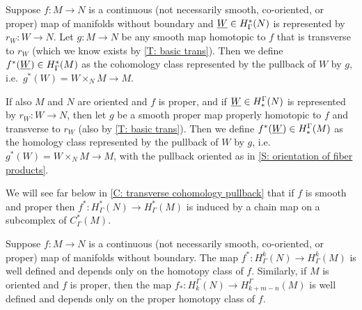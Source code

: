 \begin{definition}\label{D: cohomology pullback and homology transfer}
	Suppose $f \colon M \to N$ is a continuous (not necessarily smooth, co-oriented, or proper) map of manifolds without boundary and $\underline{W} \in H^*_\Gamma(N)$ is represented by $r_W \colon W \to N$.
	Let $g \colon M \to N$ be any smooth map homotopic to $f$ that is transverse to $r_W$ (which we know exists by \cref{T: basic trans}).
	Then we define $f^*(\underline{W}) \in H^*_\Gamma(M)$ as the cohomology class represented by the pullback of $W$ by $g$, i.e.\ $g^*(W) = W \times_N M \to M$.

	If also $M$ and $N$ are oriented and $f$ is proper, and if $\underline{W} \in H_*^\Gamma(N)$ is represented by $r_W \colon W \to N$, then let $g$ be a smooth proper map properly homotopic to $f$ and transverse to $r_W$ (also by \cref{T: basic trans}).
	Then we define $f^*(\underline{W}) \in H_*^\Gamma(M)$ as the homology class represented by the pullback of $W$ by $g$, i.e.\ $g^*(W) = W \times_N M \to M$, with the pullback oriented as in \cref{S: orientation of fiber products}.
\end{definition}

We will see far below in \cref{C: transverse cohomology pullback} that if $f$ is smooth and proper then $f^* \colon H^*_\Gamma(N) \to H^*_\Gamma(M)$ is induced by a chain map on a subcomplex of $C^*_\Gamma(M)$.

\begin{theorem}\label{P: cohomology pullback}
	Suppose $f \colon M \to N$ is a continuous (not necessarily smooth, co-oriented, or proper) map of manifolds without boundary.
	The map $f^* \colon H^k_\Gamma(N) \to H^k_\Gamma(M)$ is well defined and depends only on the homotopy class of $f$.
	Similarly, if $M$ is oriented and $f$ is proper, then the map $f_* \colon H_k^\Gamma(N) \to H_{k+m-n}^\Gamma(M)$ is well defined and depends only on the proper homotopy class of $f$.
\end{theorem}

